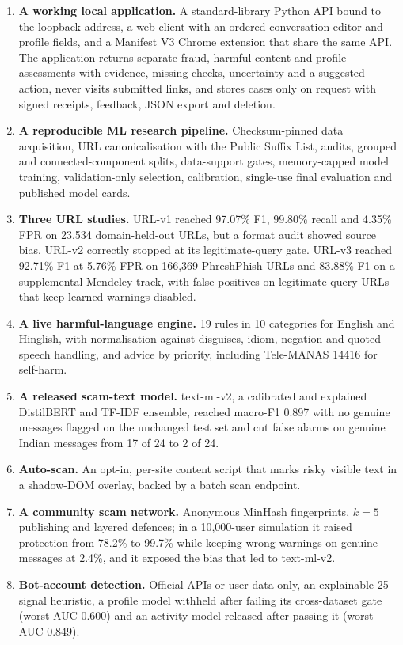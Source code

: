 \begin{enumerate}
\item \textbf{A working local application.} A standard-library Python API bound to the loopback address, a web client with an ordered conversation editor and profile fields, and a Manifest V3 Chrome extension that share the same API. The application returns separate fraud, harmful-content and profile assessments with evidence, missing checks, uncertainty and a suggested action, never visits submitted links, and stores cases only on request with signed receipts, feedback, JSON export and deletion. 
\item \textbf{A reproducible ML research pipeline.} Checksum-pinned data acquisition, URL canonicalisation with the Public Suffix List, audits, grouped and connected-component splits, data-support gates, memory-capped model training, validation-only selection, calibration, single-use final evaluation and published model cards.
\item \textbf{Three URL studies.} URL-v1 reached 97.07\% F1, 99.80\% recall and 4.35\% FPR on 23,534 domain-held-out URLs, but a format audit showed source bias. URL-v2 correctly stopped at its legitimate-query gate. URL-v3 reached 92.71\% F1 at 5.76\% FPR on 166,369 PhreshPhish URLs and 83.88\% F1 on a supplemental Mendeley track, with false positives on legitimate query URLs that keep learned warnings disabled.
\item \textbf{A live harmful-language engine.} 19 rules in 10 categories for English and Hinglish, with normalisation against disguises, idiom, negation and quoted-speech handling, and advice by priority, including Tele-MANAS 14416 for self-harm.
\item \textbf{A released scam-text model.} text-ml-v2, a calibrated and explained DistilBERT and TF-IDF ensemble, reached macro-F1 0.897 with no genuine messages flagged on the unchanged test set and cut false alarms on genuine Indian messages from 17 of 24 to 2 of 24.
\item \textbf{Auto-scan.} An opt-in, per-site content script that marks risky visible text in a shadow-DOM overlay, backed by a batch scan endpoint.
\item \textbf{A community scam network.} Anonymous MinHash fingerprints, $k=5$ publishing and layered defences; in a 10,000-user simulation it raised protection from 78.2\% to 99.7\% while keeping wrong warnings on genuine messages at 2.4\%, and it exposed the bias that led to text-ml-v2.
\item \textbf{Bot-account detection.} Official APIs or user data only, an explainable 25-signal heuristic, a profile model withheld after failing its cross-dataset gate (worst AUC 0.600) and an activity model released after passing it (worst AUC 0.849).

\end{enumerate}
